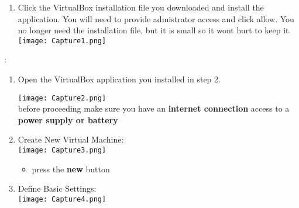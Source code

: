 \documentclass[12pt]{article}
\begin{document}
\begin{description}
\begin{description}
\begin{enumerate}[label=\alph*)]
	\item Click the VirtualBox installation file you downloaded and install the application. You will need to provide admistrator access and click allow. You no longer need the installation file, but it is small so it wont hurt to keep it. \vspace{5mm} \\
	
	\hspace*{-2.5cm}\texttt{[image: Capture1.png]}\\

\end{enumerate}
  
  
\newpage  
\item [Part 2 - Virtual Machine Configuration]: \vspace{0mm} \\
\begin{enumerate}[label=\alph*)] 
    	\item Open the VirtualBox application you installed in step 2. \vspace{5mm} \\
    	\begin{multicols}{2}
      	\texttt{[image: Capture2.png]}\\
          
                
                before proceeding make sure you have an {\bf \B internet connection } access to a {\bf \R power supply or battery }
         
            \end{multicols}
            \vspace{10mm}
       

	\item Create New Virtual Machine:  \vspace{5mm} \\
      		\hspace*{-2.5cm}\texttt{[image: Capture3.png]}\\
               \begin{itemize}
                
	\item press the {\bf new} button

                
            \end{itemize}
   
   \newpage         
          \item Define Basic Settings:  \vspace{5mm} \\  
            \hspace*{-2.5cm}\texttt{[image: Capture4.png]}\\
\begin{itemize}
                

\end{itemize}
\end{enumerate}
\end{description}
\end{description}
\end{document}
